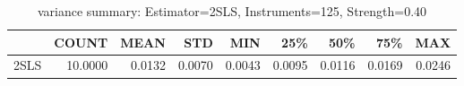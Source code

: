 \begin{table}[ht]
\centering
\caption{variance summary: Estimator=2SLS, Instruments=125, Strength=0.40}
\begin{tabular}{lrrrrrrrr}
\toprule
 & COUNT & MEAN & STD & MIN & 25\% & 50\% & 75\% & MAX \\
\midrule
2SLS & 10.0000 & 0.0132 & 0.0070 & 0.0043 & 0.0095 & 0.0116 & 0.0169 & 0.0246 \\
\bottomrule
\end{tabular}
\end{table}
